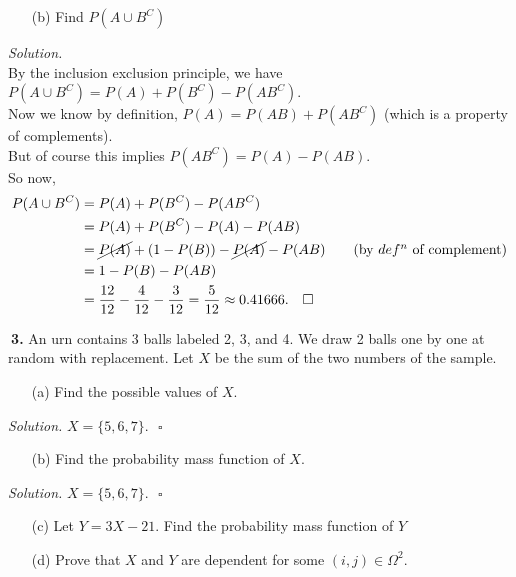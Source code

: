 \documentclass[12pt]{report}
\begin{document}
\begin{itemize}
\item [(b)] Find $P(A \cup B^C)$			%
\end{itemize}
\textit{Solution. } \\
By the inclusion exclusion principle, we have \\
$P(A \cup B^C)=P(A)+P(B^C)-P(AB^C)$.\\

\noindent Now we know by definition, $P(A)=P(AB)+P(AB^C)$ (which is a property of complements).\\
But of course this implies $P(AB^C)=P(A)-P(AB)$.\\

\noindent So now, 
\begin{align*}
P(A \cup B^C)&=P(A)+P(B^C)-P(AB^C)\\
&=P(A)+P(B^C)-P(A)-P(AB)\\
&=\cancel{P(A)}+(1-P(B))-\cancel{P(A)}-P(AB)	\tag{by $def^n$ of complement}\\
&=1-P(B)-P(AB)\\
&=\frac{12}{12}-\frac{4}{12}-\frac{3}{12}=\frac{5}{12}\approx0.41666.~~~\square
\end{align*}
\pagebreak





\noindent {} $~$\textbf{3.} An urn contains 3 balls labeled 2, 3, and 4. We draw 2 balls one by one at random with replacement. Let $X$ be the sum of the two numbers of the sample.
\begin{itemize}
\item [(a)] Find the possible values of $X$.		%
\end{itemize}
\textit{Solution. } $X=\{5,6,7\}.~~~\square$

\begin{itemize}
\item [(b)] Find the probability mass function of $X$.			%
\end{itemize}
\textit{Solution. } $X=\{5,6,7\}.~~~\square$

\begin{itemize}
\item [(c)] Let $Y=3X-21$. Find the probability mass function of $Y$			%
\end{itemize}

\begin{itemize}
\item [(d)] Prove that $X$ and $Y$ are dependent for some $(i,j)\in\Omega^2$.
\end{itemize}
\pagebreak
\end{document}
